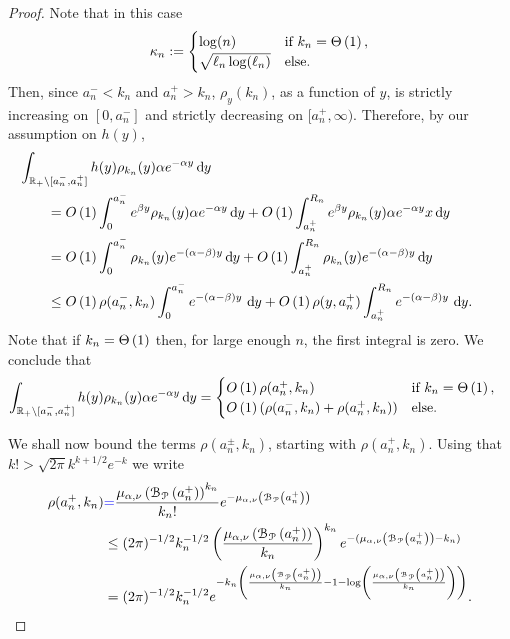 \begin{proof}
Note that in this case
\[
	\kappa_n := \begin{cases}
		\log(n) &\mbox{if } k_n = \Theta\left(1\right),\\
		\sqrt{\ell_n \log(\ell_n)} &\mbox{else.}
	\end{cases}
\]
Then, since $a_n^- < k_n$ and $a_n^+ > k_n$, $\rho_{y}(k_n)$, as a function of $y$, is strictly increasing on $[0,a_n^-]$ and strictly decreasing on $[a_n^+,\infty)$. 
Therefore, by our assumption on $h(y)$,
\begin{align*}
	&\hspace{-20pt}\int_{\R_+ \setminus [a_n^-, a_n^+]} h(y) \rho_{k_n}(y) 
		\alpha e^{-\alpha y} \dd y\\
    &= \bigO{1} \int_0^{a_n^-} e^{\beta y} \rho_{k_n}(y) \alpha e^{-\alpha y} \dd y 
    	+ \bigO{1}\int_{a_n^+}^{R_n} e^{\beta y} \rho_{k_n}(y) \alpha e^{-\alpha y}x \dd y \\
    &= \bigO{1} \int_0^{a_n^-} \rho_{k_n}(y) e^{-(\alpha-\beta) y} \dd y 
   		+ \bigO{1} \int_{a_n^+}^{R_n} \rho_{k_n}(y) e^{-(\alpha-\beta) y} \dd y\\
   	&\le \bigO{1}\rho(a_n^-,k_n)\int_0^{a_n^-} e^{-(\alpha-\beta) y} \, \dd y
   		+ \bigO{1} \rho(y,a_n^+) \int_{a_n^+}^{R_n} e^{-(\alpha-\beta) y} \, \dd y.
\end{align*}
Note that if $k_n = \Theta\left(1\right)$ then, for large enough $n$, the first integral is zero. We conclude that
\begin{equation}\label{eq:concentration_lemma_integral_bound}
\begin{aligned}
	\int_{{\mathbb R}_+ \setminus [a_n^-, a_n^+]} h(y) \rho_{k_n}(y) \alpha e^{-\alpha y} \operatorname{\mathrm{d}\hspace{-2pt}} y
	&= \begin{cases}
		O\left(1\right) \rho(a_n^+,k_n) &\mbox{if } k_n = \Theta\left(1\right),\\
		O\left(1\right) \left(\rho(a_n^-,k_n) + \rho(a_n^+,k_n)\right) &\mbox{else.}
	\end{cases}	
\end{aligned}
\end{equation}

We shall now bound the terms $\rho(a_n^\pm,k_n)$, starting with $\rho(a_n^+,k_n)$.  Using that $k! > \sqrt{2\pi} k^{k + 1/2} e^{-k}$  we write
\begin{align*}
	\rho(a_n^+,k_n) &{{\color{blue} =}} \frac{\mu_{\alpha,\nu}\left({\mathcal B}_{{\mathcal P}}\left(a_n^+\right)\right)^{k_n}}{k_n!} e^{-\mu_{\alpha,\nu}\left({\mathcal B}_{{\mathcal P}}\left(a_n^+\right)\right)} \\
	&\le (2\pi)^{-1/2} k_n^{-1/2} \left(\frac{\mu_{\alpha,\nu}\left({\mathcal B}_{{\mathcal P}}\left(a_n^+\right)\right)}{k_n}\right)^{k_n} e^{-(\mu_{\alpha,\nu}\left({\mathcal B}_{{\mathcal P}}\left(a_n^+\right)\right) - k_n)}\\
	&= (2\pi)^{-1/2} k_n^{-1/2} 
		e^{-k_n\left(\frac{\mu_{\alpha,\nu}\left({\mathcal B}_{{\mathcal P}}\left(a_n^+\right)\right)}{k_n} - 1 - \log\left(\frac{\mu_{\alpha,\nu}\left({\mathcal B}_{{\mathcal P}}\left(a_n^+\right)\right)}{k_n}\right)\right)}.
\end{align*}


\end{proof}
